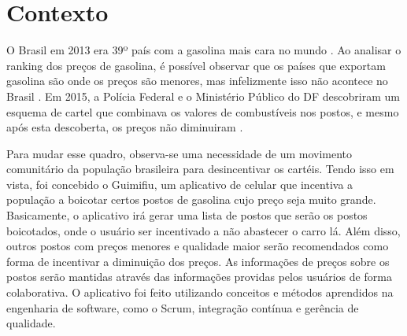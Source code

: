 \section{Contexto}
 
O Brasil em 2013 era 39º país com a gasolina mais cara no mundo \cite{oglobo}. Ao analisar o ranking dos preços de gasolina, é possível observar que os países que exportam gasolina são onde os preços são menores, mas infelizmente isso não acontece no Brasil \cite{ranking-precos}. Em 2015, a Polícia Federal e o Ministério Público do DF descobriram um esquema de cartel que combinava os valores de combustíveis nos postos, e mesmo após esta descoberta, os preços não diminuiram \cite{correio-cartel}. 

Para mudar esse quadro, observa-se uma necessidade de um movimento comunitário da população brasileira para desincentivar os cartéis. Tendo isso em vista, foi concebido o Guimifiu, um aplicativo de celular que incentiva a população a boicotar certos postos de gasolina cujo preço seja muito grande. Basicamente, o aplicativo irá gerar uma lista de postos que serão os postos boicotados, onde o usuário ser incentivado a não abastecer o carro lá. Além disso, outros postos com preços menores e qualidade maior serão recomendados como forma de incentivar a diminuição dos preços. As informações de preços sobre os postos serão mantidas através das informações providas pelos usuários de forma colaborativa. O aplicativo foi feito utilizando conceitos e métodos aprendidos na engenharia de software, como o Scrum, integração contínua e gerência de qualidade.
